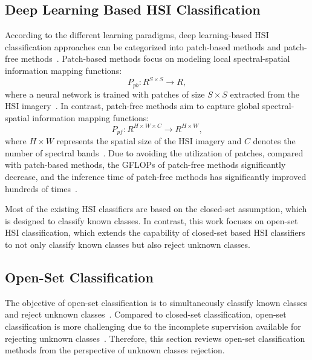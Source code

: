 \subsection{Deep Learning Based HSI Classification}

According to the different learning paradigms, deep learning-based HSI classification approaches can be categorized into patch-based methods and patch-free methods~\cite{FPGA}. Patch-based methods focus on modeling local spectral-spatial information mapping functions:
\begin{equation}
    P_{pb}:R^{S{\times}S}{\rightarrow}R,
    \label{eq:patch_based_framework}
\end{equation}
where a neural network is trained with patches of size $S{\times}S$ extracted from the HSI imagery~\cite{10400402,10050427,9785505}. In contrast, patch-free methods aim to capture global spectral-spatial information mapping functions:
\begin{equation}
    P_{pf}:R^{H{\times}W{\times}C}{\rightarrow}R^{H{\times}W},
    \label{eq:patch_free_framework}
\end{equation}
where $H{\times}W$ represents the spatial size of the HSI imagery and $C$ denotes the number of spectral bands~\cite{8737729,HU2022147,9347487}.
Due to avoiding the utilization of patches, compared with patch-based methods, the GFLOPs of patch-free methods significantly decrease, and the inference time of patch-free methods has significantly improved hundreds of times~\cite{FPGA}.

Most of the existing HSI classifiers are based on the closed-set assumption, which is designed to classify known classes. In contrast, this work focuses on open-set HSI classification, which extends the capability of closed-set based HSI classifiers to not only classify known classes but also reject unknown classes.

\subsection{Open-Set Classification}

The objective of open-set classification is to simultaneously classify known classes and reject unknown classes~\cite{9040673}. Compared to closed-set classification, open-set classification is more challenging due to the incomplete supervision available for rejecting unknown classes~\cite{9857485}. Therefore, this section reviews open-set classification methods from the perspective of unknown classes rejection.

